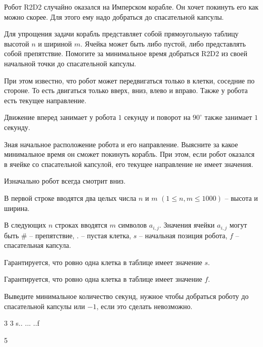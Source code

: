 
Робот R2D2 случайно оказался на Имперском корабле. Он хочет покинуть его как можно скорее. Для этого ему надо добраться до спасательной капсулы.

Для упрощения задачи корабль представляет собой прямоугольную таблицу высотой $n$ и шириной $m$. Ячейка может быть либо пустой, либо представлять собой препятствие. Помогите за минимальное время добраться R2D2 из своей начальной точки до спасательной капсулы.

При этом известно, что робот может передвигаться только в клетки, соседние по стороне. То есть двигаться только вверх, вниз, влево и вправо. Также у робота есть текущее направление.

Движение вперед занимает у робота $1$ секунду и поворот на $90^{\circ}$ также занимает $1$ секунду.

Зная начальное расположение робота и его направление. Выясните за какое минимальное время он сможет покинуть корабль. При этом, если робот оказался в ячейке со спасательной капсулой, его текущее направление не имеет значения.

Изначально робот всегда смотрит вниз.


В первой строке вводятся два целых числа $n$ и $m$ $(1 \le n, m \le 1000)$ -- высота и ширина.

В следующих $n$ строках вводятся $m$ символов $a_{i,j}$. Значения ячейки  $a_{i,j}$ могут быть $\#$ -- препятствие, $.$ -- пустая клетка, $s$ -- начальная позиция робота, $f$ -- спасательная капсула.

Гарантируется, что ровно одна клетка в таблице имеет значение $s$.

Гарантируется, что ровно одна клетка в таблице имеет значение $f$.

\outputfmtSection

Выведите минимальное количество секунд, нужное чтобы добраться роботу до спасательной капсулы или $-1$, если это сделать невозможно.

\exampleSection


\begin{myverbbox}[\small]{\vinput}
3 3
s..
...
..f
\end{myverbbox}
\begin{myverbbox}[\small]{\voutput}
5
\end{myverbbox}

